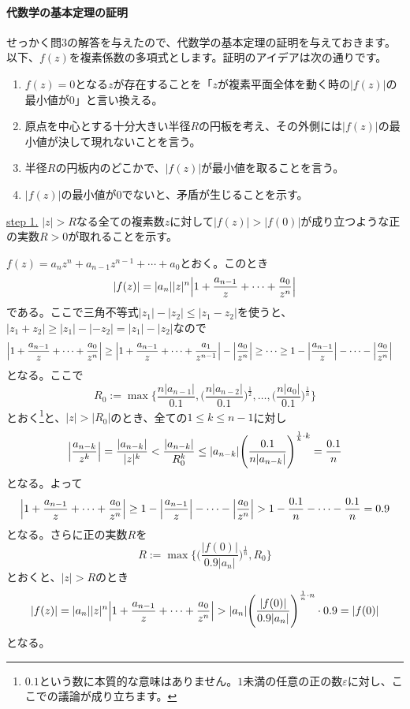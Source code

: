 \paragraph{代数学の基本定理の証明}

せっかく問$3$の解答を与えたので、代数学の基本定理の証明を与えておきます。以下、$f(z)$を複素係数の多項式とします。証明のアイデアは次の通りです。
\begin{enumerate}
\item $f(z)=0$となる$z$が存在することを「$z$が複素平面全体を動く時の$|f(z)|$の最小値が$0$」と言い換える。
\item 原点を中心とする十分大きい半径$R$の円板を考え、その外側には$|f(z)|$の最小値が決して現れないことを言う。
\item 半径$R$の円板内のどこかで、$|f(z)|$が最小値を取ることを言う。
\item $|f(z)|$の最小値が$0$でないと、矛盾が生じることを示す。
\end{enumerate}


\noindent \underline{step 1.} $|z|>R$なる全ての複素数$z$に対して$|f(z)|>|f(0)|$が成り立つような正の実数$R>0$が取れることを示す。

$f(z)=a_n z^n + a_{n-1} z^{n-1} + \cdots + a_0$とおく。このとき
\[
|f(z)| = |a_n||z|^n\Bigl|1+\frac{a_{n-1}}{z} + \cdots + \frac{a_0}{z^n}\Bigr|
\]
である。ここで三角不等式$|z_1|-|z_2|\leq|z_1-z_2|$を使うと、$|z_1+z_2|\geq|z_1|-|-z_2|=|z_1|-|z_2|$なので
\begin{align*}
\Bigl|1+\frac{a_{n-1}}{z} + \cdots + \frac{a_0}{z^n}\Bigr|
&\geq \Bigl|1+\frac{a_{n-1}}{z} + \cdots + \frac{a_1}{z^{n-1}}\Bigr| - \Bigl|\frac{a_0}{z^n}\Bigr| \geq \cdots
\geq 1-\Bigl|\frac{a_{n-1}}{z}\Bigr| - \cdots -\Bigl|\frac{a_{0}}{z^n}\Bigr|
\end{align*}
となる。ここで
\[
R_0:=\max\Biggl\{\frac{n|a_{n-1}|}{0.1},\Biggl(\frac{n|a_{n-2}|}{0.1}\Biggr)^{\frac{1}{2}},\ldots,\Biggl(\frac{n|a_{0}|}{0.1}\Biggr)^{\frac{1}{n}}\Biggr\}
\]
とおく\footnote{$0.1$という数に本質的な意味はありません。$1$未満の任意の正の数$\varepsilon$に対し、ここでの議論が成り立ちます。}と、$|z|>|R_0|$のとき、全ての$1\leq k\leq n-1$に対し
\[
\Bigl|\frac{a_{n-k}}{z^k}\Bigr| = \frac{|a_{n-k}|}{|z|^k} < \frac{|a_{n-k}|}{R_0^k} \leq |a_{n-k}|\Biggl(\frac{0.1}{n|a_{n-k}|}\Biggr)^{\frac{1}{k}\cdot k} = \frac{0.1}{n}
\]
となる。よって
\[
\Bigl|1+\frac{a_{n-1}}{z} + \cdots + \frac{a_0}{z^n}\Bigr| \geq
1-\Bigl|\frac{a_{n-1}}{z}\Bigr| - \cdots -\Bigl|\frac{a_{0}}{z^n}\Bigr|
> 1-\frac{0.1}{n}-\cdots-\frac{0.1}{n} = 0.9
\]
となる。さらに正の実数$R$を
\[
R:=\max\Biggl\{\Biggl(\frac{|f(0)|}{0.9|a_n|}\Biggr)^{\frac{1}{n}},R_0\Biggr\}
\]
とおくと、$|z|>R$のとき
\[
|f(z)| = |a_n||z|^n\Bigl|1+\frac{a_{n-1}}{z} + \cdots + \frac{a_0}{z^n}\Bigr| > |a_n|\Biggl(\frac{|f(0)|}{0.9|a_n|}\Biggr)^{\frac{1}{n}\cdot n} \cdot 0.9 = |f(0)|
\]
となる。

